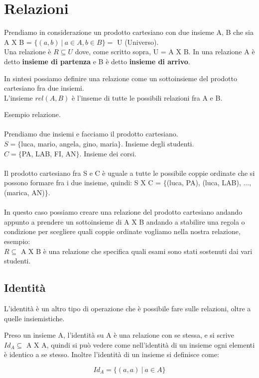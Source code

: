 \section{Relazioni}
\begin{definition}[Relazione]
Prendiamo in considerazione un prodotto cartesiano con due insieme A, B che sia A X B = $\{(a,b) \: | \: a \in A, b \in B\} = $ U (Universo). 
\\Una relazione è $R \subseteq U$ dove, come scritto sopra, U = A X B. In una relazione A è detto \textbf{insieme di partenza} e B è detto \textbf{insieme di arrivo}.
\end{definition}
\hspace{-15pt}In sintesi possiamo definire una relazione come un sottoinsieme del prodotto cartesiano fra due insiemi.\\
L'insieme $rel(A,B)$ è l'inseme di tutte le possibili relazioni fra A e B.
\begin{example}
    Esempio relazione.\\\\
    Prendiamo due insiemi e facciamo il prodotto cartesiano.\\
    $S = \{$luca, mario, angela, gino, maria$\}$. Insieme degli studenti.\\
    $C = \{$PA, LAB, FI, AN$\}$. Insieme dei corsi.\\ \\
    Il prodotto cartesiano fra S e C è uguale a tutte le possibile coppie ordinate che si possono formare fra i due insieme, quindi: \hspace{.2cm}
    S X C = $\{$(luca, PA), (luca, LAB), ..., (marica, AN)$\}$.\\ \\
    In questo caso possiamo creare una relazione del prodotto cartesiano andando appunto a prendere un sottoinsieme di A X B andando a stabilire una regola o condizione per scegliere quali coppie ordinate vogliamo nella nostra relazione, esempio:\\
    $R \subseteq$ A X B è una relazione che specifica quali esami sono stati sostenuti dai vari studenti.
\end{example}
\subsection{Identità}
L'identità è un altro tipo di operazione che è possibile fare sulle relazioni, oltre a quelle insiemistiche.
\begin{definition}[Identità]
Preso un insieme A, l'identità su A è una relazione con se stessa, e si scrive $Id_A \subseteq$ A X A, quindi si può vedere come nell'identità di un insieme ogni elementi è identico a se stesso. Inoltre l'identità di un insieme si definisce come:
\end{definition}
\vspace{-20pt}
\begin{equation}
    Id_A = \{(a,a) \: | \: a \in A\}
\end{equation}
\vspace{-20pt}

